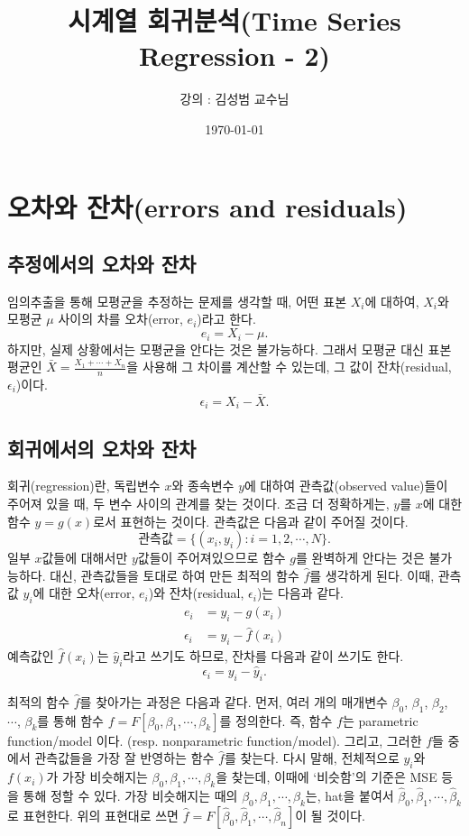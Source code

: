 \documentclass{article}
\begin{document}
\title{시계열 회귀분석(Time Series Regression - 2)}
\author{강의 : 김성범 교수님}
\date{\today}
\maketitle

\section{오차와 잔차(errors and residuals)}
\subsection{추정에서의 오차와 잔차}
임의추출을 통해 모평균을 추정하는 문제를 생각할 때, 어떤 표본 \(X_i\)에 대하여, \(X_i\)와 모평균 \(\mu\) 사이의 차를 오차(error, \(e_i\))라고 한다.
\[e_i = X_i-\mu.\]
하지만, 실제 상황에서는 모평균을 안다는 것은 불가능하다.
그래서 모평균 대신 표본평균인 \(\bar X = \frac{X_1+\cdots+X_n}n\)을 사용해 그 차이를 계산할 수 있는데, 그 값이 잔차(residual, \(\epsilon_i\))이다.
\[\epsilon_i = X_i-\bar X.\]
\subsection{회귀에서의 오차와 잔차}
회귀(regression)란, 독립변수 \(x\)와 종속변수 \(y\)에 대하여 관측값(observed value)들이 주어져 있을 때, 두 변수 사이의 관계를 찾는 것이다.
조금 더 정확하게는, \(y\)를 \(x\)에 대한 함수 \(y=g(x)\)로서 표현하는 것이다.
관측값은 다음과 같이 주어질 것이다.
\[\text{관측값} = \{(x_i,y_i):i=1,2,\cdots,N\}.\]
일부 \(x\)값들에 대해서만 \(y\)값들이 주어져있으므로 함수 \(g\)를 완벽하게 안다는 것은 불가능하다.
대신, 관측값들을 토대로 하여 만든 최적의 함수 \(\hat f\)를 생각하게 된다.
이때, 관측값 \(y_i\)에 대한 오차(error, \(e_i\))와 잔차(residual, \(\epsilon_i\))는 다음과 같다.
\begin{align}
e_i&=y_i-g(x_i)\label{error}\\
\epsilon_i&=y_i-\hat f(x_i)\label{residual}
\end{align}
예측값인 \(\hat f(x_i)\)는 \(\hat y_i\)라고 쓰기도 하므로, 잔차를 다음과 같이 쓰기도 한다.
\[\epsilon_i=y_i-\hat y_i.\]

최적의 함수 \(\hat f\)를 찾아가는 과정은 다음과 같다.
먼저, 여러 개의 매개변수 \(\beta_0\), \(\beta_1\), \(\beta_2\), \(\cdots\), \(\beta_k\)를 통해 함수 \(f=F[\beta_0,\beta_1,\cdots,\beta_k]\)를 정의한다.
즉, 함수 \(f\)는 parametric function/model 이다. (resp. nonparametric function/model).
그리고, 그러한 \(f\)들 중에서 관측값들을 가장 잘 반영하는 함수 \(\hat f\)를 찾는다.
다시 말해, 전체적으로 \(y_i\)와 \(f(x_i)\)가 가장 비슷해지는 \(\beta_0,\beta_1,\cdots,\beta_k\)을 찾는데, 이때에 `비슷함'의 기준은 MSE 등을 통해 정할 수 있다.
가장 비슷해지는 때의 \(\beta_0,\beta_1,\cdots,\beta_k\)는, hat을 붙여서 \(\hat\beta_0,\hat\beta_1,\cdots,\hat\beta_k\)로 표현한다.
위의 표현대로 쓰면 \(\hat f =  F[\hat\beta_0,\hat\beta_1,\cdots,\hat\beta_n]\)이 될 것이다.
\end{document}
